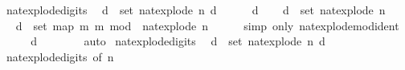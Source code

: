 \begin{isabellebody}
\ nat{\isacharunderscore}{\kern0pt}explode{\isacharprime}{\kern0pt}{\isacharunderscore}{\kern0pt}digits{\isacharcolon}{\kern0pt}\isanewline
\ \ {\isacartoucheopen}{\isasymforall}d\ {\isasymin}\ set\ {\isacharparenleft}{\kern0pt}nat{\isacharunderscore}{\kern0pt}explode{\isacharprime}{\kern0pt}\ n{\isacharparenright}{\kern0pt}{\isachardot}{\kern0pt}\ d\ {\isacharless}{\kern0pt}\ {}{}{\isacartoucheclose}\isanewline
%
\isadelimproof
%
\endisadelimproof
%
\isatagproof
{}\isamarkupfalse%
\isanewline
\ \ \isamarkupfalse%
\ d\isanewline
\ \ \isamarkupfalse%
\ {\isacartoucheopen}d\ {\isasymin}\ set\ {\isacharparenleft}{\kern0pt}nat{\isacharunderscore}{\kern0pt}explode{\isacharprime}{\kern0pt}\ n{\isacharparenright}{\kern0pt}{\isacartoucheclose}\isanewline
\ \ \isamarkupfalse%
\ \isamarkupfalse%
\ {\isacartoucheopen}d\ {\isasymin}\ set\ {\isacharparenleft}{\kern0pt}map\ {\isacharparenleft}{\kern0pt}{\isasymlambda}m{\isachardot}{\kern0pt}\ m\ mod\ {}{}{\isacharparenright}{\kern0pt}\ {\isacharparenleft}{\kern0pt}nat{\isacharunderscore}{\kern0pt}explode{\isacharprime}{\kern0pt}\ n{\isacharparenright}{\kern0pt}{\isacharparenright}{\kern0pt}{\isacartoucheclose}\isanewline
\ \ \ \ \isamarkupfalse%
\ {\isacharparenleft}{\kern0pt}simp\ only{\isacharcolon}{\kern0pt}\ nat{\isacharunderscore}{\kern0pt}explode{\isacharunderscore}{\kern0pt}mod{\isacharunderscore}{\kern0pt}{}{}{\isacharunderscore}{\kern0pt}ident{\isacharparenright}{\kern0pt}\isanewline
\ \ \isamarkupfalse%
\ \isamarkupfalse%
\ {\isacartoucheopen}d\ {\isacharless}{\kern0pt}\ {}{}{\isacartoucheclose}\isanewline
\ \ \ \ \isamarkupfalse%
\ auto\isanewline
{}\isamarkupfalse%
%
\endisatagproof
{\isafoldproof}%
%
\isadelimproof
\isanewline
%
\endisadelimproof
\isanewline
{}\isamarkupfalse%
\ nat{\isacharunderscore}{\kern0pt}explode{\isacharunderscore}{\kern0pt}digits{\isacharcolon}{\kern0pt}\isanewline
\ \ {\isacartoucheopen}{\isasymforall}d\ {\isasymin}\ set\ {\isacharparenleft}{\kern0pt}nat{\isacharunderscore}{\kern0pt}explode\ n{\isacharparenright}{\kern0pt}{\isachardot}{\kern0pt}\ d\ {\isacharless}{\kern0pt}\ {}{}{\isacartoucheclose}\isanewline
%
\isadelimproof
\ \ %
\endisadelimproof
%
\isatagproof
{}\isamarkupfalse%
\ nat{\isacharunderscore}{\kern0pt}explode{\isacharprime}{\kern0pt}{\isacharunderscore}{\kern0pt}digits\ {\isacharbrackleft}{\kern0pt}of\ n{\isacharbrackright}{\kern0pt}\ \isamarkupfalse%

\end{isabellebody}
